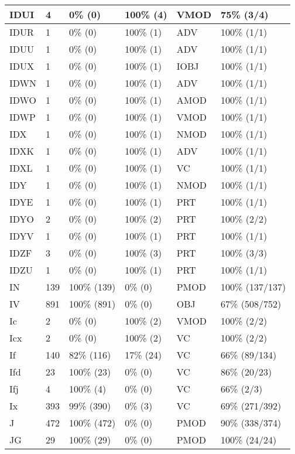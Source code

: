 \begin{figure*}
\begin{tabular}{|l|l|l|l||l|l|}
\hline
 IDUI & 4 & 0\% (0) & 100\% (4) & VMOD & 75\% (3/4) \\ 
\hline
 IDUR & 1 & 0\% (0) & 100\% (1) & ADV & 100\% (1/1) \\ 
\hline
 IDUU & 1 & 0\% (0) & 100\% (1) & ADV & 100\% (1/1) \\ 
\hline
 IDUX & 1 & 0\% (0) & 100\% (1) & IOBJ & 100\% (1/1) \\ 
\hline
 IDWN & 1 & 0\% (0) & 100\% (1) & ADV & 100\% (1/1) \\ 
\hline
 IDWO & 1 & 0\% (0) & 100\% (1) & AMOD & 100\% (1/1) \\ 
\hline
 IDWP & 1 & 0\% (0) & 100\% (1) & VMOD & 100\% (1/1) \\ 
\hline
 IDX & 1 & 0\% (0) & 100\% (1) & NMOD & 100\% (1/1) \\ 
\hline
 IDXK & 1 & 0\% (0) & 100\% (1) & ADV & 100\% (1/1) \\ 
\hline
 IDXL & 1 & 0\% (0) & 100\% (1) & VC & 100\% (1/1) \\ 
\hline
 IDY & 1 & 0\% (0) & 100\% (1) & NMOD & 100\% (1/1) \\ 
\hline
 IDYE & 1 & 0\% (0) & 100\% (1) & PRT & 100\% (1/1) \\ 
\hline
 IDYO & 2 & 0\% (0) & 100\% (2) & PRT & 100\% (2/2) \\ 
\hline
 IDYV & 1 & 0\% (0) & 100\% (1) & PRT & 100\% (1/1) \\ 
\hline
 IDZF & 3 & 0\% (0) & 100\% (3) & PRT & 100\% (3/3) \\ 
\hline
 IDZU & 1 & 0\% (0) & 100\% (1) & PRT & 100\% (1/1) \\ 
\hline
 IN & 139 & 100\% (139) & 0\% (0) & PMOD & 100\% (137/137) \\ 
\hline
 IV & 891 & 100\% (891) & 0\% (0) & OBJ & 67\% (508/752) \\ 
\hline
 Ic & 2 & 0\% (0) & 100\% (2) & VMOD & 100\% (2/2) \\ 
\hline
 Icx & 2 & 0\% (0) & 100\% (2) & VC & 100\% (2/2) \\ 
\hline
 If & 140 & 82\% (116) & 17\% (24) & VC & 66\% (89/134) \\ 
\hline
 Ifd & 23 & 100\% (23) & 0\% (0) & VC & 86\% (20/23) \\ 
\hline
 Ifj & 4 & 100\% (4) & 0\% (0) & VC & 66\% (2/3) \\ 
\hline
 Ix & 393 & 99\% (390) & 0\% (3) & VC & 69\% (271/392) \\ 
\hline
 J & 472 & 100\% (472) & 0\% (0) & PMOD & 90\% (338/374) \\ 
\hline
 JG & 29 & 100\% (29) & 0\% (0) & PMOD & 100\% (24/24) \\ 
\hline
\end{tabular}
\end{figure*}
